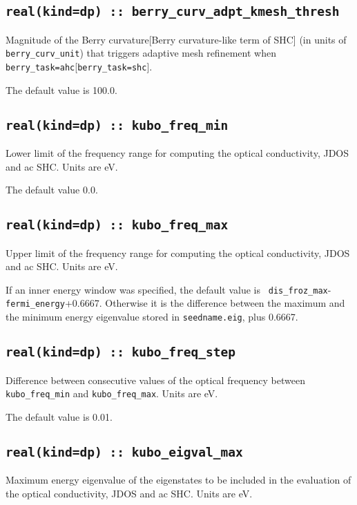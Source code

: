 \subsection[berry\_adpt\_kmesh\_thresh]{\tt real(kind=dp) ::
  berry\_curv\_adpt\_kmesh\_thresh}

Magnitude of the Berry curvature[Berry curvature-like term of SHC] (in units of {\tt berry\_curv\_unit})
that triggers adaptive mesh refinement when {\tt berry\_task=ahc}[{\tt berry\_task=shc}].

The default value is 100.0.


\subsection[optics\_energy\_min]{\tt real(kind=dp) :: kubo\_freq\_min}
Lower limit of the frequency range for computing the optical conductivity, JDOS and ac SHC. Units are eV.

The default value 0.0.

\subsection[optics\_energy\_max]{\tt real(kind=dp) :: kubo\_freq\_max}
Upper limit of the frequency range for computing the optical conductivity, JDOS and ac SHC. Units are eV.

If an inner energy window was specified, the default value is {\tt
  dis\_froz\_max}-{\tt fermi\_energy}+0.6667.  Otherwise it is the
difference between the maximum and the minimum energy eigenvalue
stored in {\tt seedname.eig}, plus 0.6667.


\subsection[optics\_energy\_step]{\tt real(kind=dp) :: kubo\_freq\_step}
Difference between consecutive values of the optical frequency
between {\tt kubo\_freq\_min} and {\tt kubo\_freq\_max}. Units are eV.

The default value is 0.01.


\subsection[optics\_energy\_max]{\tt real(kind=dp) ::
  kubo\_eigval\_max}
Maximum energy eigenvalue of the eigenstates to be included in the
evaluation of the optical conductivity, JDOS and ac SHC.  Units are eV.


